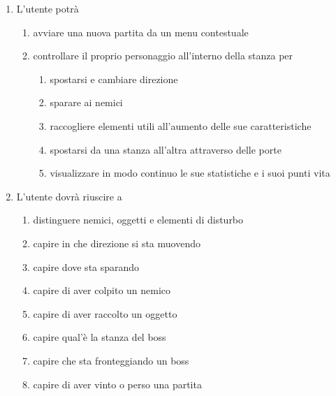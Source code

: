 \begin{enumerate}
    \item L'utente potrà 
    \begin{enumerate}
    \item avviare una nuova partita da un menu contestuale
    \item controllare il proprio personaggio all'interno della stanza per
    \begin{enumerate}
        \item spostarsi e cambiare direzione
        \item sparare ai nemici
        \item raccogliere elementi utili all'aumento delle sue caratteristiche
        \item spostarsi da una stanza all'altra attraverso delle porte
        \item visualizzare in modo continuo le sue statistiche e i suoi punti vita
    \end{enumerate}
    \end{enumerate}
    \item L'utente dovrà riuscire a 
    \begin{enumerate}
    \item distinguere nemici, oggetti e elementi di disturbo
    \item capire in che direzione si sta muovendo
    \item capire dove sta sparando
    \item capire di aver colpito un nemico
    \item capire di aver raccolto un oggetto
    \item capire qual'è la stanza del boss
    \item capire che sta fronteggiando un boss
    \item capire di aver vinto o perso una partita
    \end{enumerate}
\end{enumerate}

